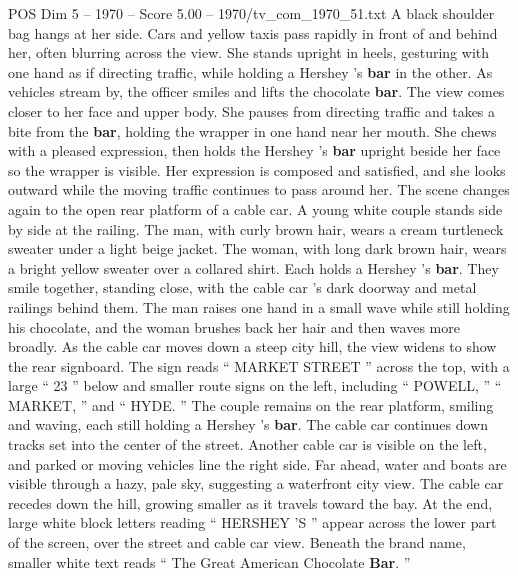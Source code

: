 \begin{textsample}{POS Dim 5 – 1970 – Score 5.00 – 1970/tv\_com\_1970\_51.txt}
A black shoulder bag hangs at her side.
Cars and yellow taxis pass rapidly in front of and behind her, often blurring across the view.
She stands upright in heels, gesturing with one hand as if directing traffic, while holding a Hershey ’s \textbf{bar} in the other.
As vehicles stream by, the officer smiles and lifts the chocolate \textbf{bar}.
The view comes closer to her face and upper body.
She pauses from directing traffic and takes a bite from the \textbf{bar}, holding the wrapper in one hand near her mouth.
She chews with a pleased expression, then holds the Hershey ’s \textbf{bar} upright beside her face so the wrapper is visible.
Her expression is composed and satisfied, and she looks outward while the moving traffic continues to pass around her.
The scene changes again to the open rear platform of a cable car.
A young white couple stands side by side at the railing.
The man, with curly brown hair, wears a cream turtleneck sweater under a light beige jacket.
The woman, with long dark brown hair, wears a bright yellow sweater over a collared shirt.
Each holds a Hershey ’s \textbf{bar}.
They smile together, standing close, with the cable car ’s dark doorway and metal railings behind them.
The man raises one hand in a small wave while still holding his chocolate, and the woman brushes back her hair and then waves more broadly.
As the cable car moves down a steep city hill, the view widens to show the rear signboard.
The sign reads “ MARKET STREET ” across the top, with a large “ 23 ” below and smaller route signs on the left, including “ POWELL, ” “ MARKET, ” and “ HYDE. ” The couple remains on the rear platform, smiling and waving, each still holding a Hershey ’s \textbf{bar}.
The cable car continues down tracks set into the center of the street.
Another cable car is visible on the left, and parked or moving vehicles line the right side.
Far ahead, water and boats are visible through a hazy, pale sky, suggesting a waterfront city view.
The cable car recedes down the hill, growing smaller as it travels toward the bay.
At the end, large white block letters reading “ HERSHEY ’S ” appear across the lower part of the screen, over the street and cable car view.
Beneath the brand name, smaller white text reads “ The Great American Chocolate \textbf{Bar}. ”

\end{textsample}
